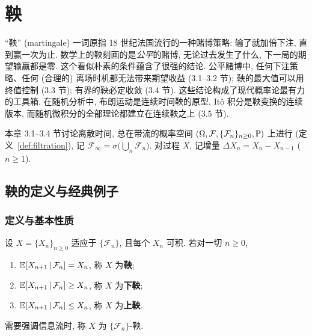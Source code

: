 \chapter{鞅}
\label{ch:3}

``鞅'' (martingale) 一词原指 18 世纪法国流行的一种赌博策略: 输了就加倍下注, 直到赢一次为止. 数学上的鞅刻画的是\emph{公平}的赌博, 无论过去发生了什么, 下一局的期望输赢都是零. 这个看似朴素的条件蕴含了很强的结论. 公平赌博中, 任何下注策略、任何 (合理的) 离场时机都无法带来期望收益 (3.1--3.2 节); 鞅的最大值可以用终值控制 (3.3 节); 有界的鞅必定收敛 (3.4 节). 这些结论构成了现代概率论最有力的工具箱. 在随机分析中, 布朗运动是连续时间鞅的原型, Itô 积分是鞅变换的连续版本, 而随机微积分的全部理论都建立在连续鞅之上 (3.5 节).

本章 3.1--3.4 节讨论离散时间, 总在带流的概率空间 $(\Omega,\mathcal{F},\{\mathcal{F}_n\}_{n\ge0},\P)$ 上进行 (定义~\ref{def:filtration}), 记 $\mathcal{F}_\infty=\sigma\big(\bigcup_n\mathcal{F}_n\big)$. 对过程 $X$, 记增量 $\Delta X_n=X_n-X_{n-1}$ ($n\ge1$).

\section{鞅的定义与经典例子}
\label{sec:3-1}

\subsection{定义与基本性质}

\begin{definition}[鞅、下鞅、上鞅]\label{def:martingale}
设 $X=\{X_n\}_{n\ge0}$ 适应于 $\{\mathcal{F}_n\}$, 且每个 $X_n$ 可积. 若对一切 $n\ge0$,
\begin{enumerate}
\item $\E[X_{n+1}\,|\,\mathcal{F}_n]=X_n$, 称 $X$ 为\textbf{鞅};
\item $\E[X_{n+1}\,|\,\mathcal{F}_n]\ge X_n$, 称 $X$ 为\textbf{下鞅};
\item $\E[X_{n+1}\,|\,\mathcal{F}_n]\le X_n$, 称 $X$ 为\textbf{上鞅}.
\end{enumerate}
需要强调信息流时, 称 $X$ 为 $\{\mathcal{F}_n\}$-鞅.
\end{definition}

